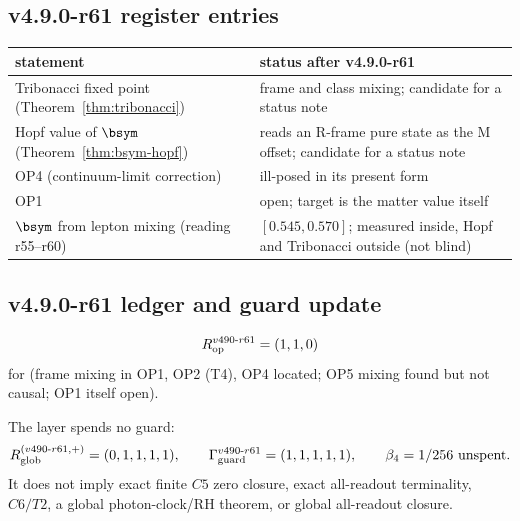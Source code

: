 \subsection*{v4.9.0-r61 register entries}
\label{subsec:v490-r61-register}

\begin{center}
\small
\begin{tabular}{@{}>{\raggedright\arraybackslash}p{}>{\raggedright\arraybackslash}p{}@{}}
\toprule
statement & status after v4.9.0-r61\\
\midrule
Tribonacci fixed point (Theorem~\ref{thm:tribonacci}) & frame and class mixing; candidate for a status note\\
Hopf value of \(\bsym\) (Theorem~\ref{thm:bsym-hopf}) & reads an R-frame pure state as the M offset; candidate for a status note\\
OP4 (continuum-limit correction) & ill-posed in its present form\\
OP1 & open; target is the matter value itself\\
\(\bsym\) from lepton mixing (reading r55--r60) & \([0.545,0.570]\); measured inside, Hopf and Tribonacci outside (not blind)\\
\bottomrule
\end{tabular}
\end{center}

\subsection*{v4.9.0-r61 ledger and guard update}
\label{subsec:v490-r61-ledger-guard}

\[
R_{\rm op}^{v490\text{-}r61}=(1,1,0)
\]
for (frame mixing in OP1, OP2 (T4), OP4 located; OP5 mixing found but not causal; OP1 itself open).

The layer spends no guard:
\[
R_{\rm glob}^{(v490\text{-}r61,+)}=(0,1,1,1,1),
\qquad
\Gamma_{\rm guard}^{v490\text{-}r61}=(1,1,1,1,1),
\qquad
\beta_4=1/256\ \text{unspent}.
\]
It does not imply exact finite \(C5\) zero closure, exact all-readout terminality,
\(C6/T2\), a global photon-clock/RH theorem, or global all-readout closure.
